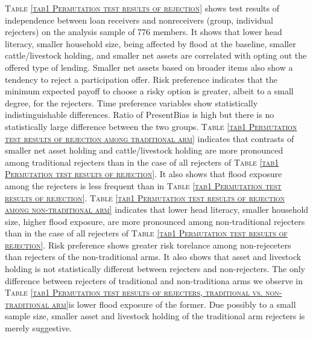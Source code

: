 
	\textsc{\normalsize Table \ref{tab1 Permutation test results of rejection}} shows test results of independence between loan receivers and nonreceivers (group, individual rejecters) on the analysis sample of 776 members. It shows that lower head literacy, smaller household size, being affected by flood at the baseline, smaller cattle/livestock holding, and smaller net assets are correlated with opting out the offered type of lending. Smaller net assets based on broader items also show a tendency to reject a participation offer. \textsf{Risk preference} indicates that the minimum expected payoff to choose a risky option is greater, albeit to a small degree, for the rejecters. Time preference variables show statistically indistinguishable differences. Ratio of \textsf{PresentBias} is high but there is no statistically large difference between the two groups.
	\textsc{\normalsize Table \ref{tab1 Permutation test results of rejection among traditional arm}} indicates that contrasts of smaller net asset holding and cattle/livestock holding are more pronounced among \textsf{traditional} rejecters than in the case of all rejecters of \textsc{\normalsize Table \ref{tab1 Permutation test results of rejection}}. It also shows that flood exposure among the rejecters is less frequent than in \textsc{\normalsize Table \ref{tab1 Permutation test results of rejection}}. 
	\textsc{\normalsize Table \ref{tab1 Permutation test results of rejection among non-traditional arm}} indicates that lower head literacy, smaller household size, higher flood exposure, are more pronounced among non-\textsf{traditional} rejecters than in the case of all rejecters of \textsc{\normalsize Table \ref{tab1 Permutation test results of rejection}}. \textsf{Risk preference} shows greater risk torelance among non-rejeceters than rejecters of the non-\textsf{traditional} arms. It also shows that asset and livestock holding is not statistically different between rejecters and non-rejecters. The only difference between rejecters of \textsf{traditional} and non-\textsf{traditiona} arms we observe in \textsc{\normalsize Table \ref{tab1 Permutation test results of rejecters, traditional vs. non-traditional arm}}is lower flood exposure of the former. Due possibly to a small sample size, smaller asset and livestock holding of the \textsf{traditional} arm rejecters is merely suggestive. 
	
